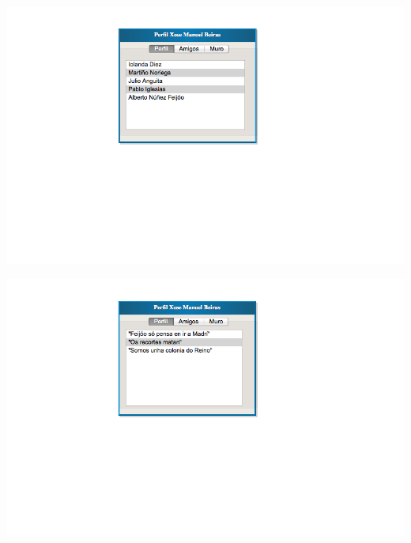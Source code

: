 \documentclass[12pt, a4paper, titlepage]{article}
\begin{document}
\begin{center}
	\includegraphics[scale=0.7]{Imagenes/perfil_amigo_amigos}
\end{center}

\begin{center}
	\includegraphics[scale=0.7]{Imagenes/perfil_amigo_muro}
\end{center}
\end{document}
